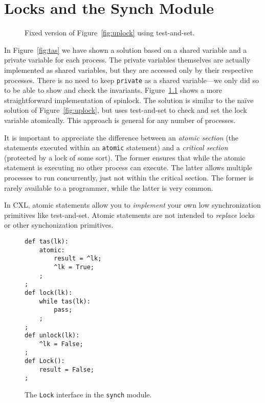 \documentclass{report}
\newenvironment{code}{
\tcolorbox
}{
\endtcolorbox
}
\begin{document}
\chapter{Locks and the Synch Module}

\begin{figure}
\begin{code}
\end{code}
\caption{Fixed version of Figure~\ref{fig:uplock} using test-and-set.}
\label{fig:tas2}
\end{figure}

In Figure~\ref{fig:tas} we have shown a solution based on a shared
variable and a private variable for each process.   The private
variables themselves are actually implemented as shared variables,
but they are accessed only by their respective processes.
There is no need to keep \texttt{private} as a shared
variable---we only did so to be able to show and check the invariants.
Figure~\ref{fig:tas2} shows a more straightforward implementation of spinlock.
The solution is similar to the na\"{i}ve solution of Figure~\ref{fig:uplock},
but uses test-and-set to check and set the lock variable atomically.
This approach is general for any number of processes.

It is important to appreciate the difference between an
\emph{atomic section} (the statements executed within an
\texttt{atomic} statement) and a \emph{critical section}
(protected by a lock of some sort).
The former ensures that while the
atomic statement is executing no other process can execute.
The latter allows multiple processes to run concurrently,
just not within the critical section.
The former is rarely available to a programmer, while the latter
is very common.

In CXL, atomic statements allow you to \emph{implement} your own
low synchronization primitives like test-and-set.  Atomic statements
are not intended to \emph{replace} locks or other synchonization primitives.

\begin{figure}
\begin{code}
\begin{verbatim}
def tas(lk):
    atomic:
        result = ^lk;
        ^lk = True;
    ;
;
def lock(lk):
    while tas(lk):
        pass;
    ;
;
def unlock(lk):
    ^lk = False;
;
def Lock():
    result = False;
;
\end{verbatim}
\end{code}
\caption{The \texttt{Lock} interface in the \texttt{synch} module.}
\label{fig:locks}
\end{figure}
\end{document}
